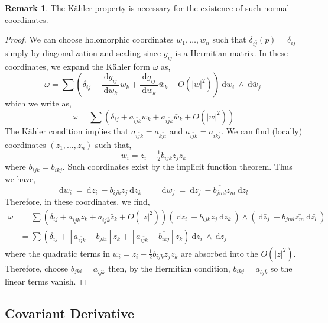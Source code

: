 \documentclass[12pt]{extarticle}
\renewcommand{\d}[1]{\: \mathrm{d}#1 \:}
\newcommand{\deriv}[2]{\frac{\d{#1}}{\d{#2}}}
\theoremstyle{definition}
\newtheorem{remark}{Remark}
\begin{document}
\begin{remark}
The K\"{a}hler property is necessary for the existence of such normal coordinates.
\end{remark}

\begin{proof}
We can choose holomorphic coordinates $w_1, \dots, w_n$ such that $\delta_{i \bar{j}}(p) = \delta_{ij}$ simply by diagonalization and scaling since $g_{i \bar{j}}$ is a Hermitian matrix. In these coordinates, we expand the K\"{a}hler form $\omega$ as,
\[ \omega = \sum \left( \delta_{ij} + \deriv{g_{i \bar{j}}}{w_k} w_k + \deriv{g_{i \bar{j}}}{\bar{w}_k} \bar{w}_k + O(|w|^2) \right) \d{w_i} \wedge \d{\bar{w}_j}  \] 
which we write as,
\[ \omega = \sum \left( \delta_{ij} + a_{i \bar{j} k} w_k + a_{i \bar{j} \bar{k}} \bar{w}_k + O(|w|^2) \right) \]
The K\"{a}hler condition implies that $a_{i \bar{j} k} = a_{k \bar{j} i}$ and $a_{i \bar{j} \bar{k}} = a_{i\bar{k} \bar{j}}$. We can find (locally) coordinates $(z_1, \dots, z_n)$ such that,
\[ w_i = z_i - \tfrac{1}{2} b_{ijk} z_j z_k \]
where $b_{ijk} = b_{ikj}$. Such coordinates exist by the implicit function theorem. Thus we have,
\[ \d{w_i} = \d{z_i} - b_{ijk} z_j \d{z_k} \quad \quad \d{\bar{w}_j} = \d{\bar{z}_j} - \overline{b_{jml}} \bar{z_m} \d{\bar{z_l}} \]
Therefore, in these coordinates, we find,
\begin{align*}
\omega & = \sum \left( \delta_{ij} + a_{i \bar{j} k} z_k + a_{i \bar{j} \bar{k}} \bar{z}_k + O(|z|^2) \right) \left( \d{z_i} - b_{ijk} z_j \d{z_k} \right) \wedge \left( \d{\bar{z}_j} - \overline{b_{jml}} \bar{z_m} \d{\bar{z_l}} \right)
\\
& = \sum \left( \delta_{ij} + [ a_{i \bar{j} k} - b_{jki} ] z_k + [a_{i \bar{j} \bar{k}} - \overline{b_{ikj}}] \bar{z}_k \right) \d{z_i} \wedge \d{z_j} 
\end{align*}
where the quadratic terms in $w_i = z_i - \tfrac{1}{2} b_{ijk} z_j z_k$ are absorbed into the $O(|z|^2)$. Therefore, choose $b_{jki} = a_{i \bar{j} k}$ then, by the Hermitian condition, $\overline{b_{ikj}} = a_{i \bar{j} \bar{k}}$ so the linear terms vanish.  
\end{proof}

\subsection{Covariant Derivative}
\end{document}
